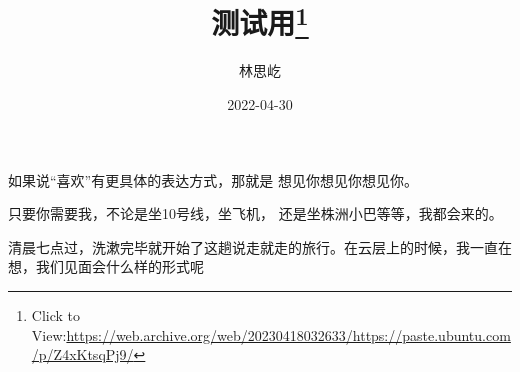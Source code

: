 \documentclass{article}
\title{测试用\footnote{Click to View:\url{https://web.archive.org/web/20230418032633/https://paste.ubuntu.com/p/Z4xKtsqPj9/}}}
\author{林思屹}
\date{2022-04-30}
\begin{document}

\maketitle


\Large

如果说“喜欢”有更具体的表达方式，那就是
想见你想见你想见你。 

只要你需要我，不论是坐10号线，坐飞机，
还是坐株洲小巴等等，我都会来的。 

清晨七点过，洗漱完毕就开始了这趟说走就走的旅行。在云层上的时候，我一直在想，我们见面会什么样的形式呢
\end{document}
